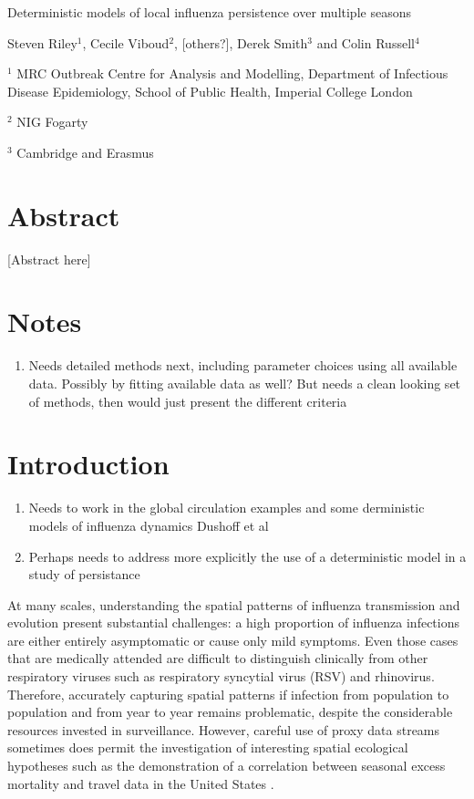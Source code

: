 \documentclass[12pt]{article}
\begin{document}
\raggedright

\Large
Deterministic models of local influenza persistence over multiple seasons
\normalsize

\vspace{1cm}
Steven Riley$^1$, Cecile Viboud$^2$, [others?], Derek Smith$^3$ and Colin Russell$^4$

\vspace{1cm}
$^1$ MRC Outbreak Centre for Analysis and Modelling, Department of Infectious Disease Epidemiology, School of Public Health, Imperial College London

$^2$ NIG Fogarty

$^3$ Cambridge and Erasmus

\clearpage
\section*{Abstract}
[Abstract here]

\clearpage
\doublespacing

\section*{Notes}
\begin{enumerate}
\item Needs detailed methods next, including parameter choices using all available data. Possibly by fitting available data as well? But needs a clean looking set of methods, then would just present the different criteria
\end{enumerate}


\section*{Introduction}
\begin{enumerate}
\item Needs to work in the global circulation examples and some derministic models of influenza dynamics Dushoff et al
\item Perhaps needs to address more explicitly the use of a deterministic model in a study of persistance
\end{enumerate}

At many scales, understanding the spatial patterns of influenza transmission and evolution present substantial challenges: a high proportion of influenza infections are either entirely asymptomatic or cause only mild symptoms. Even those cases that are medically attended are difficult to distinguish clinically from other respiratory viruses such as respiratory syncytial virus (RSV) and rhinovirus. Therefore, accurately capturing spatial patterns if infection from population to population and from year to year remains problematic, despite the considerable resources invested in surveillance. However, careful use of proxy data streams sometimes does permit the investigation of interesting spatial ecological hypotheses such as the demonstration of a correlation between seasonal excess mortality and travel data in the United States \cite{Viboud:2006p1326}.
\end{document}
